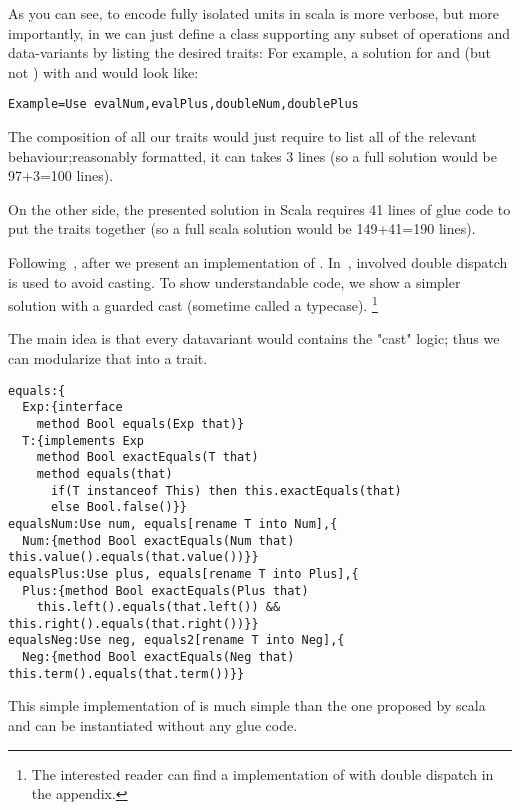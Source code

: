 As you can see, to encode fully isolated units in scala is
more verbose,
but more importantly,
in \name we can just define a class supporting any subset of operations
and data-variants by listing the desired traits:
For example, a solution for \Q@Num@ and \Q@Plus@ (but not \Q@Neg@)
with \Q@eval@ and \Q@double@ would look like:
\begin{lstlisting}
Example=Use evalNum,evalPlus,doubleNum,doublePlus
\end{lstlisting}
The composition of all our traits would just require to list all
of the relevant behaviour;reasonably formatted, it can takes 3 lines (so a full \name solution would be 97+3=100 lines).

On the other side, the presented solution in Scala requires
41 lines of glue code to put the traits together
(so a full scala solution would be 149+41=190 lines).

Following~\cite{}, after \Q@double@ we present an implementation of \Q@equals@.
In~\cite{}, involved double dispatch is used to avoid casting.
To show understandable code, we show a simpler solution 
with a guarded cast (sometime called a typecase).%
\footnote{
The interested reader can find a \name implementation of \Q@equals@ with double dispatch
in the appendix.
}

The main idea is that  every datavariant would contains
 the "cast" logic; thus
 we can modularize that into a \Q@equals@ trait.
\begin{lstlisting}
equals:{
  Exp:{interface
    method Bool equals(Exp that)}
  T:{implements Exp
    method Bool exactEquals(T that)
    method equals(that) 
      if(T instanceof This) then this.exactEquals(that)
      else Bool.false()}}
equalsNum:Use num, equals[rename T into Num],{
  Num:{method Bool exactEquals(Num that) this.value().equals(that.value())}}
equalsPlus:Use plus, equals[rename T into Plus],{
  Plus:{method Bool exactEquals(Plus that)
    this.left().equals(that.left()) && this.right().equals(that.right())}}
equalsNeg:Use neg, equals2[rename T into Neg],{
  Neg:{method Bool exactEquals(Neg that) this.term().equals(that.term())}}
\end{lstlisting}

This simple implementation of \Q@equals@
is much simple than the one proposed by scala
 and can be instantiated without any glue code.

